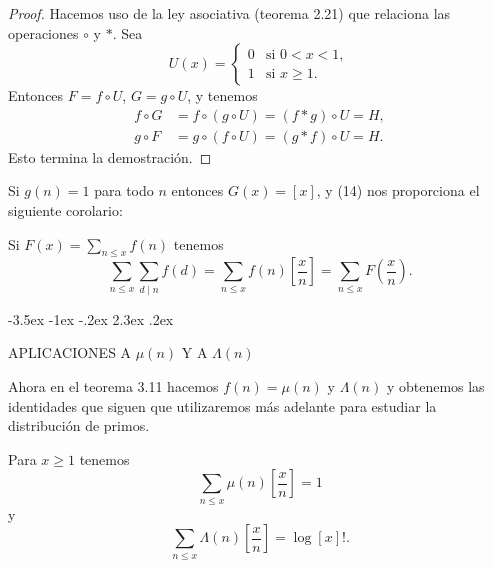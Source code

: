 \documentclass[12pt,a4paper]{book}
\makeatletter
\renewcommand\section{\@startsection{section}{1}{\z@}%
  {-3.5ex \@plus -1ex \@minus -.2ex}%
  {2.3ex \@plus .2ex}%
  {\normalfont\Large\bfseries\raggedright}}
\makeatother
\begin{document}
    \begin{proof}
        Hacemos uso de la ley asociativa (teorema 2.21) que relaciona las operaciones
        $\circ$ y $*$. Sea
        \begin{equation*}
            U(x)=
            \begin{cases}
                0 & \text{si } 0<x<1,\\
                1 & \text{si } x\geq1.
            \end{cases}
        \end{equation*}
        Entonces $F=f\circ U$, $G=g\circ U$, y tenemos
        \begin{align*}
            f\circ G&=f\circ(g\circ U)=(f*g)\circ U=H,\\
            g\circ F&=g\circ(f\circ U)=(g*f)\circ U=H.
        \end{align*}
        Esto termina la demostración.
    \end{proof}

    Si $g(n)=1$ para todo $n$ entonces $G(x)=[x]$, y (14) nos proporciona el siguiente
    corolario:

    \begin{teorema}
        Si $F(x)=\sum_{n\leq x}f(n)$ tenemos
        \begin{equation}
            \sum_{n\leq x}\sum_{d\mid n}f(d)=\sum_{n\leq x}f(n)\left[\frac{x}{n}\right]
            =\sum_{n\leq x}F\left(\frac{x}{n}\right).
        \end{equation}
    \end{teorema}

    \section{APLICACIONES A \texorpdfstring{$\mu(n)$}{μ(n)} Y A \texorpdfstring{$\Lambda(n)$}{Λ(n)}}

    Ahora en el teorema 3.11 hacemos $f(n)=\mu(n)$ y $\Lambda(n)$ y obtenemos las
    identidades que siguen que utilizaremos más adelante para estudiar la distribución de
    primos.

    \begin{teorema}
        Para $x\geq1$ tenemos
        \begin{equation}
            \sum_{n\leq x}\mu(n)\left[\frac{x}{n}\right]=1
        \end{equation}
        y
        \begin{equation}
            \sum_{n\leq x}\Lambda(n)\left[\frac{x}{n}\right]=\log[x]!.
        \end{equation}
    \end{teorema}
\end{document}
